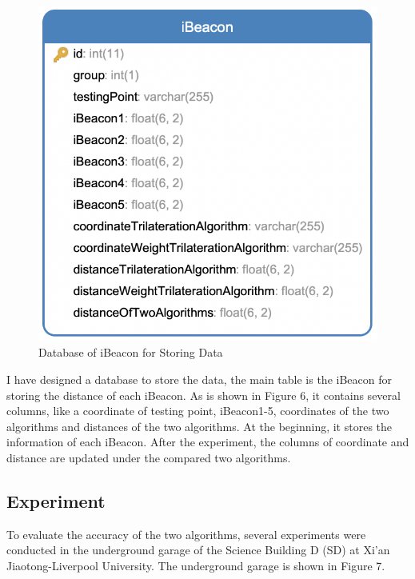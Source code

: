 \documentclass{sigchi}
\begin{document}
\begin{figure}[!h]
\centering
\includegraphics[width=1\columnwidth]{10.png}
\caption{Database of iBeacon for Storing Data}
\label{fig:universe}
\end{figure}

I have designed a database to store the data, the main table is the iBeacon for storing the distance of each iBeacon. As is shown in Figure 6, it contains several columns, like a coordinate of testing point, iBeacon1-5, coordinates of the two algorithms and distances of the two algorithms. At the beginning, it stores the information of each iBeacon. After the experiment, the columns of coordinate and distance are updated under the compared two algorithms.


\subsection{Experiment}

To evaluate the accuracy of the two algorithms, several experiments were conducted in the underground garage of the Science Building D (SD) at Xi'an Jiaotong-Liverpool University. The underground garage is shown in Figure 7.
\end{document}
